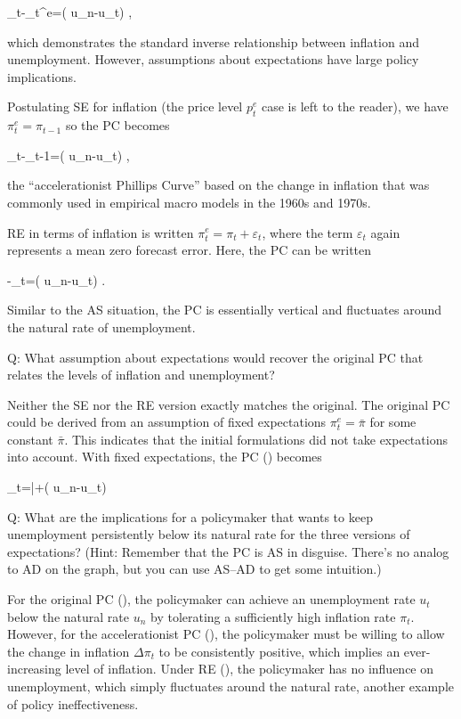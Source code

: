 ﻿\documentclass[oneside]{book}
\begin{document}
\pi _{t}-\pi _{t}^{e}=( u_{n}-u_{t}) ,


which demonstrates the standard inverse relationship between inflation and
unemployment. However, assumptions about expectations have large
policy implications.

Postulating SE for inflation (the price level $p_{t}^{e}$ case is left to the reader), we have $\pi _{t}^{e}=\pi _{t-1}$ so the PC becomes



\pi _{t}-\pi _{t-1}=( u_{n}-u_{t}) ,


the ``accelerationist Phillips Curve'' based on the change in inflation that
was commonly used in empirical macro models in the 1960s and 1970s.

RE in terms of inflation is written $\pi _{t}^{e}=\pi
_{t}+\varepsilon _{t}$, where the term $\varepsilon _{t}$ again represents a mean zero
forecast error. Here, the PC can be written



-\varepsilon _{t}=\gamma ( u_{n}-u_{t}) .


Similar to the AS situation, the PC is essentially vertical and
fluctuates around the natural rate of unemployment.

Q: What assumption about expectations would recover the original PC that
relates the levels of inflation and unemployment?

Neither the SE nor the RE version exactly matches the original. The original PC
could be derived from an assumption of fixed expectations $\pi _{t}^{e}=\bar{\pi}$ for some constant $\bar{\pi}$. This indicates that the initial
formulations did not take expectations into account. With fixed
expectations, the PC () becomes



\pi _{t}=\bar{\pi}+( u_{n}-u_{t})



Q:  What are the implications for a policymaker that wants to keep
unemployment persistently below its natural rate for the three versions of
expectations? (Hint: Remember that the PC is AS in disguise. There's no analog to AD on the graph, but you can use AS--AD to get some intuition.)

For the original PC (), the policymaker can achieve an
unemployment rate $u_{t}$ below the natural rate $u_{n}$ by tolerating a
sufficiently high inflation rate $\pi _{t}$. However, for the
accelerationist PC (), the policymaker must be willing to allow the
change in inflation $\Delta \pi _{t}$ to be consistently positive, which
implies an ever-increasing level of inflation. Under RE (), the
policymaker has no influence on unemployment, which simply fluctuates around
the natural rate, another example of policy ineffectiveness.
\end{document}
